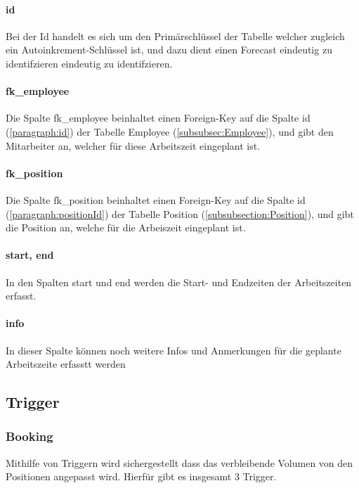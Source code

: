 \documentclass{article}
\begin{document}
\paragraph{id} Bei der Id handelt es sich um den Primärschlüssel der Tabelle welcher zugleich
ein Autoinkrement-Schlüssel ist, und dazu dient einen Forecast eindeutig zu
identifzieren eindeutig zu identifzieren.

\paragraph{fk\_employee} Die Spalte fk\_employee beinhaltet einen Foreign-Key auf die Spalte id
(\ref{paragraph:id}) der Tabelle Employee (\ref{subsubsec:Employee}), und gibt
den Mitarbeiter an, welcher für diese Arbeitszeit eingeplant ist.

\paragraph{fk\_position} Die Spalte fk\_position beinhaltet einen Foreign-Key auf die Spalte id
(\ref{paragraph:positionId}) der Tabelle Position
(\ref{subsubsection:Position}), und gibt die Position an, welche für die
Arbeiszeit eingeplant ist.

\paragraph{start, end} In den Spalten start und end werden die Start- und Endzeiten der Arbeitszeiten
erfasst.

\paragraph{info} In dieser Spalte können noch weitere Infos und Anmerkungen für die geplante
Arbeitszeite erfasstt werden

\subsection{Trigger}

\subsubsection{Booking}
Mithilfe von Triggern wird sichergestellt dass das verbleibende Volumen von den
Positionen angepasst wird. Hierfür gibt es insgesamt 3 Trigger.
\end{document}
